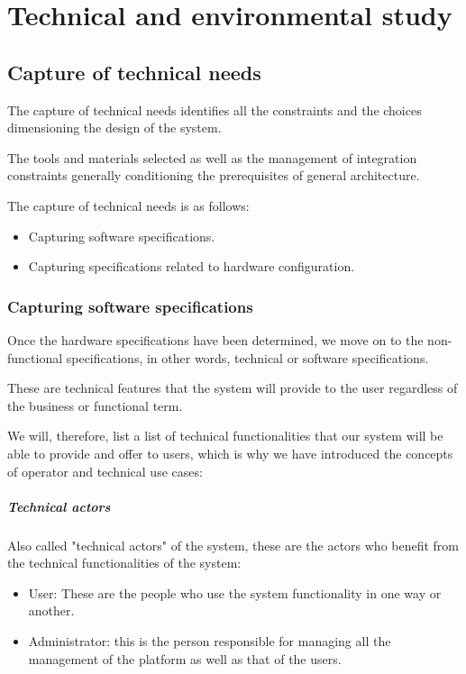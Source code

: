 

\setcounter{mtc}{9}

\chapter{Technical and environmental study}%
\label{chap:chapter_tree}
\minitoc
\section{Capture of technical needs}
The capture of technical needs identifies all the constraints and the choices dimensioning the design of the system.

The tools and materials selected as well as the management of integration constraints generally conditioning the prerequisites of general architecture.

The capture of technical needs is as follows:
\begin{itemize}\addtolength{\itemsep}{-0.35\baselineskip}
      \item
            Capturing software specifications.

      \item
            Capturing specifications related to hardware configuration.

\end{itemize}

\subsection{Capturing software specifications}
Once the hardware specifications have been determined, we move on to the non-functional specifications, in other words, technical or software specifications.

These are technical features that the system will provide to the user regardless of the business or functional term.

We will, therefore, list a list of technical functionalities that our system will be able to provide and offer to users, which is why we have introduced the concepts of operator and technical use cases:

\paragraph{Technical actors}
Also called "technical actors" of the system, these are the actors who benefit from the technical functionalities of the system:
\begin{itemize}\addtolength{\itemsep}{-0.35\baselineskip}
      \item
            User: These are the people who use the system functionality in one way or another.
      \item
            Administrator: this is the person responsible for managing all the management of the platform as well as that of the users.
\end{itemize}

